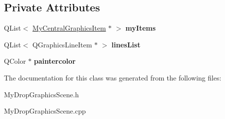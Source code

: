 \subsection*{Private Attributes}
\begin{DoxyCompactItemize}
\item 
\hypertarget{class_my_drop_graphics_scene_ac7085f0aaf1b342d91c554a842c000e5}{}Q\+List$<$ \hyperlink{class_my_central_graphics_item}{My\+Central\+Graphics\+Item} $\ast$ $>$ {\bfseries my\+Items}\label{class_my_drop_graphics_scene_ac7085f0aaf1b342d91c554a842c000e5}

\item 
\hypertarget{class_my_drop_graphics_scene_a5d0b65a8d6b76bd9f0e951aa0b7bc81f}{}Q\+List$<$ Q\+Graphics\+Line\+Item $\ast$ $>$ {\bfseries lines\+List}\label{class_my_drop_graphics_scene_a5d0b65a8d6b76bd9f0e951aa0b7bc81f}

\item 
\hypertarget{class_my_drop_graphics_scene_ae483c253389eb08913a0b906653d2e31}{}Q\+Color $\ast$ {\bfseries paintercolor}\label{class_my_drop_graphics_scene_ae483c253389eb08913a0b906653d2e31}

\end{DoxyCompactItemize}


The documentation for this class was generated from the following files\+:\begin{DoxyCompactItemize}
\item 
My\+Drop\+Graphics\+Scene.\+h\item 
My\+Drop\+Graphics\+Scene.\+cpp\end{DoxyCompactItemize}
